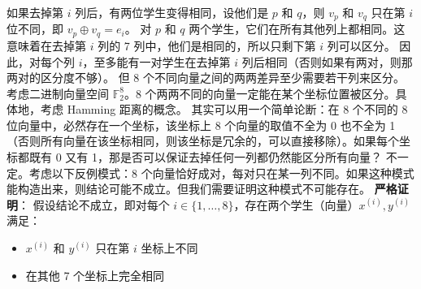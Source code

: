 \documentclass[10pt,a4paper,openany]{ctexbook}
\theoremstyle{definition}
\theoremstyle{remark}
\begin{document}
如果去掉第 $i$ 列后，有两位学生变得相同，设他们是 $p$ 和 $q$，则 $v_p$ 和 $v_q$ 只在第 $i$ 位不同，即 $v_p \oplus v_q = e_i$。
对 $p$ 和 $q$ 两个学生，它们在所有其他列上都相同。这意味着在去掉第 $i$ 列的 7 列中，他们是相同的，所以只剩下第 $i$ 列可以区分。
因此，对每个列 $i$，至多能有一对学生在去掉第 $i$ 列后相同（否则如果有两对，则那两对的区分度不够）。
但 8 个不同向量之间的两两差异至少需要若干列来区分。
考虑二进制向量空间 $\mathbb{F}_2^8$。8 个两两不同的向量一定能在某个坐标位置被区分。具体地，考虑 Hamming 距离的概念。
其实可以用一个简单论断：在 8 个不同的 8 位向量中，必然存在一个坐标，该坐标上 8 个向量的取值不全为 0 也不全为 1（否则所有向量在该坐标相同，则该坐标是冗余的，可以直接移除）。如果每个坐标都既有 0 又有 1，那是否可以保证去掉任何一列都仍然能区分所有向量？
不一定。考虑以下反例模式：8 个向量恰好成对，每对只在某一列不同。如果这种模式能构造出来，则结论可能不成立。但我们需要证明这种模式不可能存在。
\textbf{严格证明}：
假设结论不成立，即对每个 $i \in \{1,\dots,8\}$，存在两个学生（向量）$x^{(i)}, y^{(i)}$ 满足：
\begin{itemize}
\item $x^{(i)}$ 和 $y^{(i)}$ 只在第 $i$ 坐标上不同
\item 在其他 7 个坐标上完全相同

\end{itemize}
\end{document}
